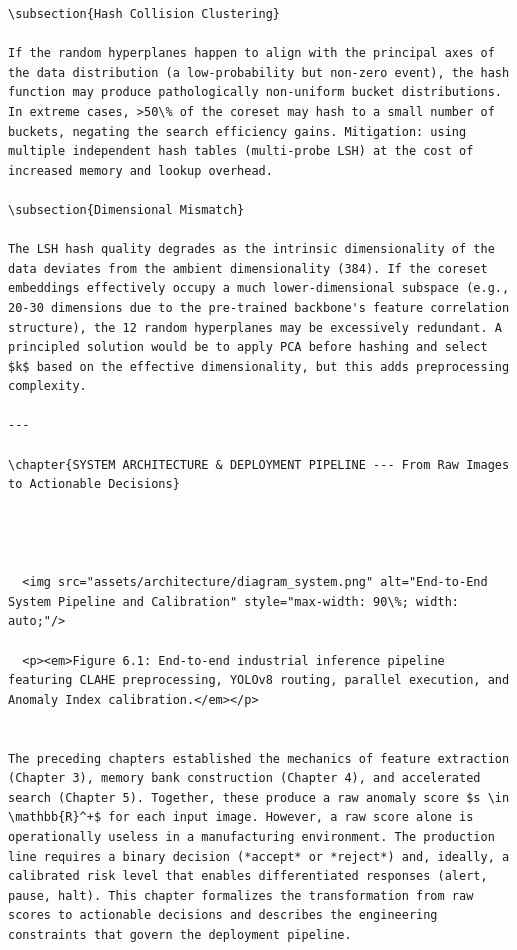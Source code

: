\documentclass[12pt,a4paper,oneside]{report}
\begin{document}
\begin{verbatim}
\subsection{Hash Collision Clustering}

If the random hyperplanes happen to align with the principal axes of the data distribution (a low-probability but non-zero event), the hash function may produce pathologically non-uniform bucket distributions. In extreme cases, >50\% of the coreset may hash to a small number of buckets, negating the search efficiency gains. Mitigation: using multiple independent hash tables (multi-probe LSH) at the cost of increased memory and lookup overhead.

\subsection{Dimensional Mismatch}

The LSH hash quality degrades as the intrinsic dimensionality of the data deviates from the ambient dimensionality (384). If the coreset embeddings effectively occupy a much lower-dimensional subspace (e.g., 20-30 dimensions due to the pre-trained backbone's feature correlation structure), the 12 random hyperplanes may be excessively redundant. A principled solution would be to apply PCA before hashing and select $k$ based on the effective dimensionality, but this adds preprocessing complexity.

---

\chapter{SYSTEM ARCHITECTURE & DEPLOYMENT PIPELINE --- From Raw Images to Actionable Decisions}




  <img src="assets/architecture/diagram_system.png" alt="End-to-End System Pipeline and Calibration" style="max-width: 90\%; width: auto;"/>
  
  <p><em>Figure 6.1: End-to-end industrial inference pipeline featuring CLAHE preprocessing, YOLOv8 routing, parallel execution, and Anomaly Index calibration.</em></p>


The preceding chapters established the mechanics of feature extraction (Chapter 3), memory bank construction (Chapter 4), and accelerated search (Chapter 5). Together, these produce a raw anomaly score $s \in \mathbb{R}^+$ for each input image. However, a raw score alone is operationally useless in a manufacturing environment. The production line requires a binary decision (*accept* or *reject*) and, ideally, a calibrated risk level that enables differentiated responses (alert, pause, halt). This chapter formalizes the transformation from raw scores to actionable decisions and describes the engineering constraints that govern the deployment pipeline.


\end{verbatim}
\end{document}
